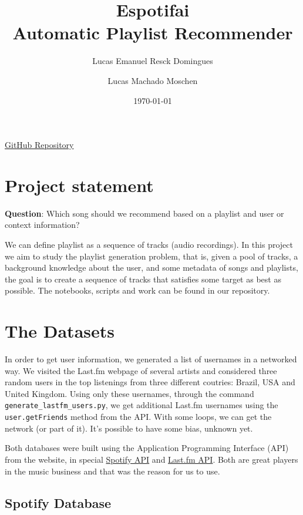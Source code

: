 \documentclass{article}
\title{Espotifai\\
\vspace{10pt}
\large Automatic Playlist Recommender}
\author[]{Lucas Emanuel Resck Domingues}
\author[]{Lucas Machado Moschen}
\affil[]{\textit{School of Applied Mathematics}
\\ \textit{Getulio Vargas Foundation}}
\date{\today}
\begin{document}
\maketitle

\begin{center}
    \href{https://github.com/lucasresck/espotifai}{GitHub Repository}
\end{center}

\section{Project statement}

    \textbf{Question}: Which song should we recommend based on
    a playlist and user or context information?

    We can define playlist as a sequence of tracks (audio recordings).
    In this project we aim to study the playlist generation problem, that is,
    given a pool of tracks, a background knowledge about the user,
    and some metadata of songs and playlists, the goal is to create a sequence
    of tracks that satisfies some target as best as possible. The notebooks,
    scripts and work can be found in our repository.

\section{The Datasets}

In order to get user information, we generated a list of usernames in a
networked way.  We visited the Last.fm webpage of several artists and
considered three random users in the top listenings from three different
coutries: Brazil, USA and United Kingdom. Using only these usernames, through
the command \lstinline{generate_lastfm_users.py},  we get additional
Last.fm usernames using the \lstinline{user.getFriends} method from the API. 
With some loops, we can get the network (or part of it). It's possible to have
some bias, unknown yet.

Both databases were built using the Application Programming Interface (API) from the
website, in special
\href{https://developer.spotify.com/documentation/web-api/}{Spotify API} and
\href{https://www.last.fm/api/}{Last.fm API}. Both are great players in the
music business and that was the reason for us to use. 

\subsection{Spotify Database}
\end{document}
